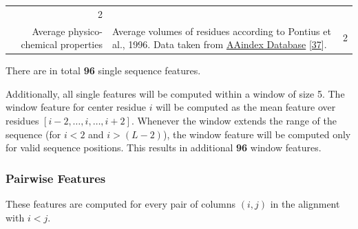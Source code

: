 \documentclass[12pt,a4paper,twoside]{book}
\theoremstyle{definition}
\theoremstyle{definition}
\theoremstyle{remark}
\begin{document}
\begin{longtable}[]{@{}rlc@{}}
\begin{minipage}[t]{0.18\columnwidth}
2\strut
\end{minipage}\tabularnewline
\begin{minipage}[t]{0.23\columnwidth}\raggedleft\strut
Average physico-chemical properties\strut
\end{minipage} & \begin{minipage}[t]{0.50\columnwidth}\raggedright\strut
Average volumes of residues according to Pontius et al., 1996. Data
taken from
\href{http://www.genome.jp/dbget-bin/www_bget?aaindex:PONJ960101}{AAindex
Database} {[}\protect\hyperlink{ref-Kawashima2008}{37}{]}.\strut
\end{minipage} & \begin{minipage}[t]{0.18\columnwidth}\centering\strut
2\strut
\end{minipage}\tabularnewline
\bottomrule
\end{longtable}

There are in total \textbf{96} single sequence features.

Additionally, all single features will be computed within a window of
size 5. The window feature for center residue \(i\) will be computed as
the mean feature over residues \([i-2, \ldots, i, \ldots, i+2]\).
Whenever the window extends the range of the sequence (for \(i\!<\!2\)
and \(i\!>\!(L-2)\)), the window feature will be computed only for valid
sequence positions. This results in additional \textbf{96} window
features.

\subsubsection{Pairwise Features}\label{seq-features-pairwise}

These features are computed for every pair of columns \((i, j)\) in the
alignment with \(i<j\).
\end{document}
